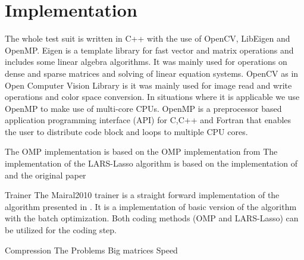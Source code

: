 \section{Implementation}

The whole test suit is written in C++ with the use of OpenCV, LibEigen and OpenMP.
Eigen \cite{Eigen} is a template library for fast vector and matrix operations and includes some linear algebra algorithms.
It was mainly used for operations on dense and sparse matrices and solving of linear equation systems.
OpenCV \cite{OpenCV} as in Open Computer Vision Library is it was mainly used for image read and write operations and color space conversion.
In situations where it is applicable we use OpenMP to make use of multi-core CPUs. OpenMP \cite{OpenMP}
is a preprocessor based application programming interface (API) for C,C++ and Fortran that enables 
the user to distribute code block and loops to multiple CPU cores. 

The OMP implementation is based on the OMP implementation from \cite{Rubinstein}
The implementation of the LARS-Lasso algorithm is based on the implementation of \cite{Strand2005} and the original paper \cite{Efron2004}

Trainer
The Mairal2010 trainer is a straight forward implementation of the algorithm presented in \cite{Mairal2010}.
It is a implementation of basic version of the algorithm with the batch optimization. 
Both coding methods (OMP and LARS-Lasso) can be utilized for the coding step.


Compression
The 
Problems
Big matrices
Speed 


